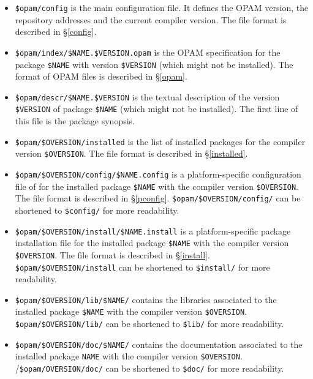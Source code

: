 \documentclass[a4paper,11pt]{article}
\begin{document}
\begin{itemize}

\item {\tt \$opam/config} is the main configuration file. It defines
  the OPAM version, the repository addresses and the current compiler
  version. The file format is described in \S\ref{config}.

\item \verb+$opam/index/$NAME.$VERSION.opam+ is the OPAM specification
  for the package \verb+$NAME+ with version \verb+$VERSION+ (which
  might not be installed). The format of OPAM files is described in
  \S\ref{opam}.

\item \verb+$opam/descr/$NAME.$VERSION+ is the textual description of
  the version \verb+$VERSION+ of package \verb+$NAME+ (which might not
  be installed). The first line of this file is the package synopsis.

\item \verb+$opam/$OVERSION/installed+ is the list of installed
  packages for the compiler version \verb+$OVERSION+. The file format
  is described in \S\ref{installed}.

\item \verb+$opam/$OVERSION/config/$NAME.config+ is a
  platform-specific configuration file of for the installed package
  \verb+$NAME+ with the compiler version \verb+$OVERSION+. The file
  format is described in \S\ref{pconfig}.
  \verb+$opam/$OVERSION/config/+ can be shortened to \verb+$config/+
  for more readability.

\item \verb+$opam/$OVERSION/install/$NAME.install+ is a
  platform-specific package installation file for the installed
  package \verb+$NAME+ with the compiler version \verb+$OVERSION+. The
  file format is described in \S\ref{install}.
  \verb+$opam/$OVERSION/install+ can be shortened to \verb+$install/+
  for more readability.

\item \verb+$opam/$OVERSION/lib/$NAME/+ contains the libraries
  associated to the installed package \verb+$NAME+ with the compiler
  version \verb+$OVERSION+. \verb+$opam/$OVERSION/lib/+ can be
  shortened to \verb+$lib/+ for more readability.

\item \verb+$opam/$OVERSION/doc/$NAME/+ contains the documentation
  associated to the installed package {\tt NAME} with the compiler
  version \verb+$OVERSION+. /\verb+$opam/OVERSION/doc/+ can be
  shortened to \verb+$doc/+ for more readability.


\end{itemize}
\end{document}

